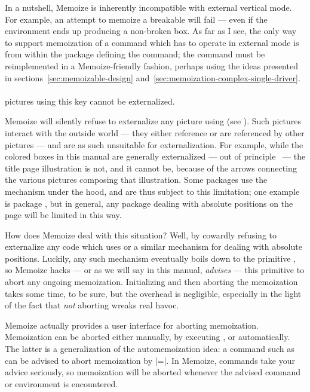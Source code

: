 \documentclass[a4paper,11pt]{article}
\begin{document}
In a nutshell, Memoize is inherently incompatible with external vertical mode.
For example, an attempt to memoize a breakable  will fail ---
even if the environment ends up producing a non-broken box.  As far as I see,
the only way to support memoization of a command which has to operate in
external mode is from within the package defining the command; the command must
be reimplemented in a Memoize-friendly fashion, perhaps using the ideas
presented in sections~\ref{sec:memoizable-design}
and~\ref{sec:memoization-complex-single-driver}.



\paragraph{}
\TikZ pictures using this key cannot be externalized.

Memoize will silently refuse to externalize any \TikZ picture using
 (see ).  Such pictures
interact with the outside world --- they either reference or are referenced by
other pictures --- and are as such unsuitable for externalization.  For
example, while the colored boxes in this manual are generally externalized ---
out of principle \Smiley\ --- the title page illustration is not, and it cannot
be, because of the arrows connecting the various \TikZ pictures composing that
illustration.  Some packages use the  mechanism
under the hood, and are thus subject to this limitation; one example is package
, but in general, any package dealing with absolute positions on the
page will be limited in this way.

How does Memoize deal with this situation?  Well, by cowardly refusing to
externalize any code which uses  or a similar
mechanism for dealing with absolute positions.  Luckily, any such mechanism
eventually boils down to the  primitive , so
Memoize hacks --- or as we will say in this manual, \emph{advises} --- this
primitive to abort any ongoing memoization.  Initializing and then aborting the
memoization takes some time, to be sure, but the overhead is negligible,
especially in the light of the fact that \emph{not} aborting wreaks real havoc.

Memoize actually provides a user interface for aborting memoization.
Memoization can be aborted either manually, by executing , or
automatically.  The latter is a generalization of the automemoization idea: a
command such as  can be advised to abort memoization by
|=|.  In Memoize,
commands take your advice seriously, so memoization will be aborted whenever
the advised command or environment is encountered.
\end{document}
